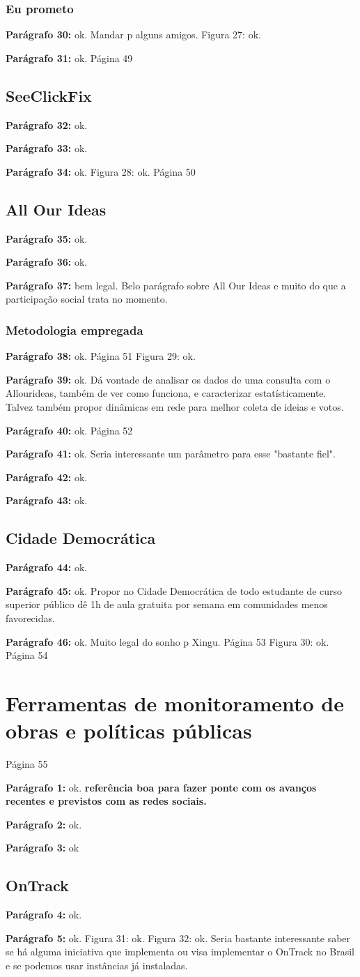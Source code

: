 \documentclass[12pt]{report}
\newcommand{\pp}[1]{

\textbf{Parágrafo #1:}
}
\begin{document}
\subsubsection{Eu prometo}
\pp{30} ok. Mandar p alguns amigos.
Figura 27: ok.
\pp{31} ok.
\noindent Página 49
\subsection{SeeClickFix}
\pp{32} ok.
\pp{33} ok.
\pp{34} ok.
Figura 28: ok.
\noindent Página 50
\subsection{All Our Ideas}
\pp{35} ok.
\pp{36} ok.
\pp{37} bem legal. Belo parágrafo sobre All Our Ideas e muito do que a participação social trata no momento.
\subsubsection{Metodologia empregada}
\pp{38} ok.
\noindent Página 51
Figura 29: ok.
\pp{39} ok. Dá vontade de analisar os dados de uma consulta com o Allourideas, também de ver como funciona, e caracterizar estatísticamente. Talvez também propor dinâmicas em rede para melhor coleta de ideias e votos.
\pp{40} ok.
\noindent Página 52
\pp{41} ok. Seria interessante um parâmetro para esse "bastante fiel".
\pp{42} ok.
\pp{43} ok.
\subsection{Cidade Democrática}
\pp{44} ok.
\pp{45} ok. Propor no Cidade Democrática de todo estudante de curso superior público dê 1h de aula gratuita por semana em comunidades menos favorecidas.
\pp{46} ok. Muito legal do sonho p Xingu.
\noindent Página 53
Figura 30: ok.
\noindent Página 54
\section{Ferramentas de monitoramento de obras e políticas públicas}
\noindent Página 55
\pp{1} ok. {\bf \color{red} referência boa para fazer ponte com os avanços recentes e previstos com as redes sociais.}
\pp{2} ok.
\pp{3} ok
\subsection{OnTrack}
\pp{4} ok.
\pp{5} ok.
Figura 31: ok.
Figura 32: ok. Seria bastante interessante saber se há alguma iniciativa que implementa ou visa implementar o OnTrack no Brasil e se podemos usar instâncias já instaladas.
\end{document}
